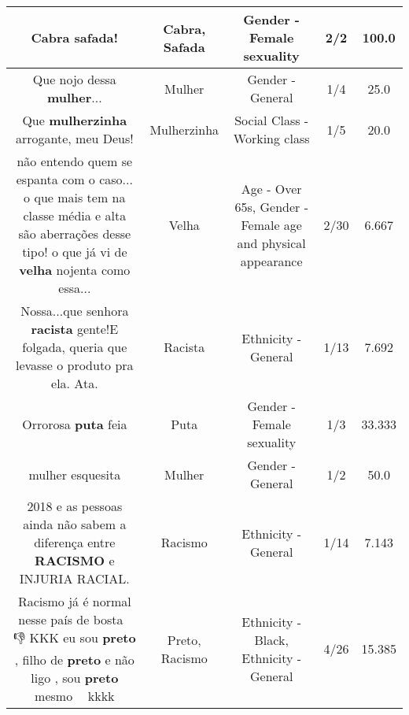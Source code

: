\documentclass[11pt]{article}
\newlength\mylength
\begin{document}
\begin{center}
\begin{longtable}{|C{.65\mylength}|C{.30\mylength}|C{.12\mylength}|C{.12\mylength}|C{.12\mylength}|}
  \small Cabra \textbf{safada}!\normalsize   & Cabra, Safada & Gender - Female sexuality & 2/2 & 100.0 \\  \hline
  \small Que nojo dessa \textbf{mulher}...\normalsize   & Mulher & Gender - General & 1/4 & 25.0 \\  \hline
  \small Que \textbf{mulherzinha} arrogante, meu Deus!\normalsize   & Mulherzinha & Social Class - Working class & 1/5 & 20.0 \\  \hline
  \small não entendo quem se espanta com o caso... o que mais tem na classe média e alta são aberrações desse tipo! o que já vi de \textbf{v\textbf{elha}} nojenta como essa...\normalsize   & Velha & Age - Over 65s, Gender - Female age and physical appearance & 2/30 & 6.667 \\  \hline
  \small Nossa...que senhora \textbf{racista} gente!E folgada, queria que levasse o produto pra ela. Ata.\normalsize   & Racista & Ethnicity - General & 1/13 & 7.692 \\  \hline
  \small Orrorosa \textbf{puta} feia\normalsize   & Puta & Gender - Female sexuality & 1/3 & 33.333 \\  \hline
  \small mulher esquesita\normalsize   & Mulher & Gender - General & 1/2 & 50.0 \\  \hline
  \small 2018 e as pessoas ainda não sabem a diferença entre \textbf{RACISMO} e INJURIA RACIAL.\normalsize   & Racismo & Ethnicity - General & 1/14 & 7.143 \\  \hline
  \small Racismo já é normal nesse país de bosta 💩👎 KKK eu sou \textbf{preto} , filho de \textbf{preto} e não ligo , sou \textbf{preto} mesmo 🤵🏿 kkkk\normalsize   & Preto, Racismo & Ethnicity - Black, Ethnicity - General & 4/26 & 15.385 \\  \hline

\end{longtable}
\end{center}
\end{document}

